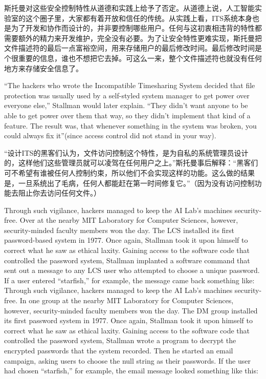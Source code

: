 \ifdefined\chs
斯托曼对这些安全控制特性从道德和实践上给予了否定。从道德上说，人工智能实验室的这个圈子里，大家都有着开放和信任的传统。从实践上看，ITS系统本身也是为了开发和协作而设计的，并非要控制哪些用户。任何与这初衷相违背的特性都需要额外的精力来开发维护，完全没有必要。\ifdefined\vtwo 为了让安全特性更难实现，斯托曼把文件描述符的最后一点富裕空间，用来存储用户的最后修改时间。最后修改时间是个很重要的信息，谁也不想把它去掉。可这么一来，整个文件描述符也就没有任何地方来存储安全信息了。\fi
\fi

\ifdefined\eng
``The hackers who wrote the Incompatible Timesharing System decided that file protection was usually used by a self-styled system manager to get power over everyone else,'' Stallman would later explain. ``They didn't want anyone to be able to get power over them that way, so they didn't implement that kind of a feature. The result was, that whenever something in the system was broken, you could always fix it''\ifdefined\vtwo (since access control did not stand in your way)\fi .
\fi

\ifdefined\chs
``设计ITS的黑客们认为，文件访问控制这个特性，是为自私的系统管理员设计的，这样他们这些管理员就可以凌驾在任何用户之上。''斯托曼事后解释：``黑客们可不希望有谁被任何人控制约束，所以他们不会实现这样的功能。这么做的结果是，一旦系统出了毛病，任何人都能赶在第一时间修复它。''\ifdefined\vtwo （因为没有访问控制功能去阻止你去访问任何文件。）\fi{}
\fi

\ifdefined\eng
\ifdefined\vone
Through such vigilance, hackers managed to keep the AI Lab's machines security-free. Over at the nearby MIT Laboratory for Computer Sciences, however, security-minded faculty members won the day. The LCS installed its first password-based system in 1977. Once again, Stallman took it upon himself to correct what he saw as ethical laxity. Gaining access to the software code that controlled the password system, Stallman implanted a software command that sent out a message to any LCS user who attempted to choose a unique password. If a user entered ``starfish,'' for example, the message came back something like:
\fi
\ifdefined\vtwo
Through such vigilance, hackers managed to keep the AI Lab's machines security-free. In one group at the nearby MIT Laboratory for Computer Sciences, however, security-minded faculty members won the day. The DM group installed its first password system in 1977. Once again, Stallman took it upon himself to correct what he saw as ethical laxity. Gaining access to the software code that controlled the password system, Stallman wrote a program to decrypt the encrypted passwords that the system recorded.  Then he started an email campaign, asking users to choose the null string as their passwords. If the user had chosen ``starfish,'' for example, the email message looked something like this:
\fi
\fi

